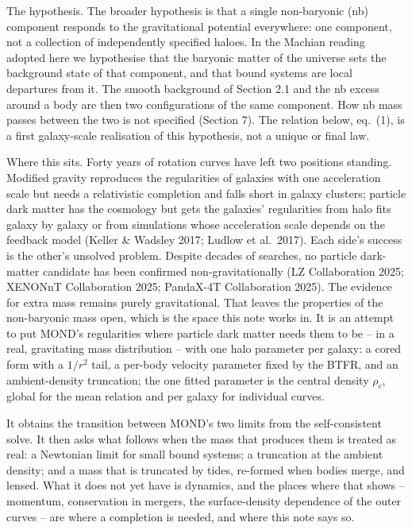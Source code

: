 \documentclass[
  10pt,
]{article}
\begin{document}
The hypothesis. The broader hypothesis is that a single non-baryonic (nb) component responds to the gravitational potential everywhere: one component, not a collection of independently specified haloes. In the Machian reading adopted here we hypothesise that the baryonic matter of the universe sets the background state of that component, and that bound systems are local departures from it. The smooth background of Section 2.1 and the nb excess around a body are then two configurations of the same component. How nb mass passes between the two is not specified (Section 7). The relation below, eq.~(1), is a first galaxy-scale realisation of this hypothesis, not a unique or final law.

Where this sits. Forty years of rotation curves have left two positions standing. Modified gravity reproduces the regularities of galaxies with one acceleration scale but needs a relativistic completion and falls short in galaxy clusters; particle dark matter has the cosmology but gets the galaxies' regularities from halo fits galaxy by galaxy or from simulations whose acceleration scale depends on the feedback model (Keller \& Wadsley 2017; Ludlow et al.~2017). Each side's success is the other's unsolved problem. Despite decades of searches, no particle dark-matter candidate has been confirmed non-gravitationally (LZ Collaboration 2025; XENONnT Collaboration 2025; PandaX-4T Collaboration 2025). The evidence for extra mass remains purely gravitational. That leaves the properties of the non-baryonic mass open, which is the space this note works in. It is an attempt to put MOND's regularities where particle dark matter needs them to be -- in a real, gravitating mass distribution -- with one halo parameter per galaxy: a cored form with a $1/r^2$ tail, a per-body velocity parameter fixed by the BTFR, and an ambient-density truncation; the one fitted parameter is the central density $\rho_c$, global for the mean relation and per galaxy for individual curves.

It obtains the transition between MOND's two limits from the self-consistent solve. It then asks what follows when the mass that produces them is treated as real: a Newtonian limit for small bound systems; a truncation at the ambient density; and a mass that is truncated by tides, re-formed when bodies merge, and lensed. What it does not yet have is dynamics, and the places where that shows -- momentum, conservation in mergers, the surface-density dependence of the outer curves -- are where a completion is needed, and where this note says so.
\end{document}
